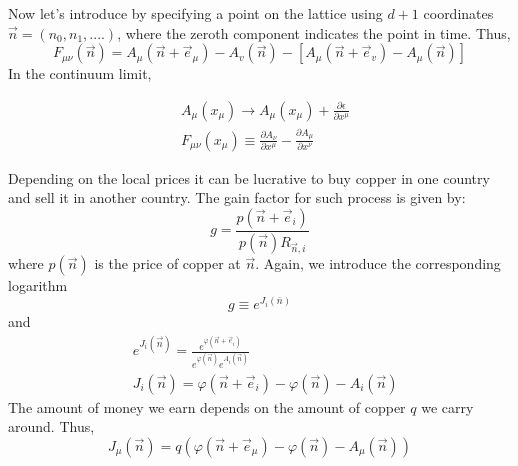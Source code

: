 Now let's introduce  by specifying a point on the lattice using $d+1$ coordinates $\vec{n}=(n_0,n_1,....)$, where the zeroth component indicates the point in time. Thus,
\begin{equation}
F_{\mu \nu}(\vec{n})=A_{\mu}\left(\vec{n}+\vec{e}_{\mu}\right)-A_{v}(\vec{n})-\left[A_{\mu}\left(\vec{n}+\vec{e}_{v}\right)-A_{\mu}(\vec{n})\right]
\end{equation}
In the continuum limit,
\begin{qt}
\begin{equation}
\begin{aligned}
&A_{\mu}\left(x_{\mu}\right) \rightarrow A_{\mu}\left(x_{\mu}\right)+\frac{\partial \epsilon}{\partial x^{\mu}}\\
&F_{\mu \nu}\left(x_{\mu}\right) \equiv \frac{\partial A_{\nu}}{\partial x^{\mu}}-\frac{\partial A_{\mu}}{\partial x^{\nu}}
\end{aligned}
\end{equation}
\end{qt}
 Depending on the local prices it can be lucrative to buy copper in one country and sell it in another country. The gain factor for such process is given by:
\begin{equation}
g=\frac{p\left(\vec{n}+\vec{e}_{i}\right)}{p(\vec{n}) R_{\vec{n}, i}}
\end{equation}
where $p(\vec{n})$ is the price of copper at $\vec{n}$. Again, we introduce the corresponding logarithm
\begin{equation}
g \equiv e^{J_{i}(\bar{n})}
\end{equation}
and
\begin{equation}
\begin{aligned}
&e^{J_{i}(\vec{n})}=\frac{e^{\varphi\left(\vec{n}+\vec{e}_{i}\right)}}{e^{\varphi(\vec{n})} e^{A_{i}(\vec{n})}}\\
&J_{i}(\vec{n})=\varphi\left(\vec{n}+\vec{e}_{i}\right)-\varphi(\vec{n})-A_{i}(\vec{n})
\end{aligned}
\end{equation}
The amount of money we earn depends on the amount of copper $q$ we carry around. Thus,
\begin{equation}
J_{\mu}(\vec{n})=q\left(\varphi\left(\vec{n}+\vec{e}_{\mu}\right)-\varphi(\vec{n})-A_{\mu}(\vec{n})\right)
\end{equation}
